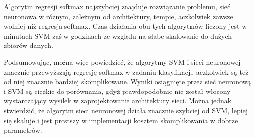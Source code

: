 \documentclass[11pt]{article}
\begin{document}
Algorytm regresji softmax najszybciej znajduje rozwiązanie problemu,
sieć neuronowa w różnym, zależnym od architektury, tempie, aczkolwiek
zawsze wolniej niż regresja softmax. Czas działania obu tych algorytmów
liczony jest w minutach SVM zaś w godzinach ze względu na słabe
skalowanie do dużych zbiorów danych.

Podsumowując, można więc powiedzieć, że algorytmy SVM i sieci neuronowej
znacznie przewyższają regresję softmax w zadaniu klasyfikacji,
aczkolwiek są też od niej znacznie bardziej skomplikowane. Wyniki
osiągnięte przez sieć neuronową i SVM są ciężkie do porównania, gdyż
prawdopodobnie nie został włożony wystarczający wysiłek w
zaprojektowanie architektury sieci. Można jednak stwierdzić, że algorytm
sieci neuronowej działa znacznie szybciej od SVM, lepiej się skaluje i
jest prostszy w implementacji kosztem skomplikowania w dobrze
parametrów.

      
\end{document}
